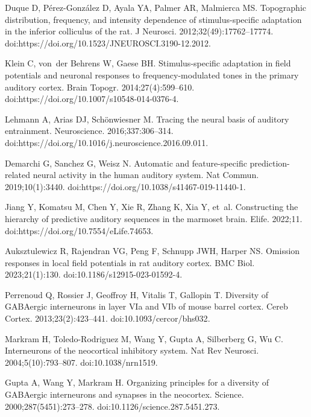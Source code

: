 \documentclass[10pt,letterpaper]{article}
\begin{document}
\begin{thebibliography}{100}
  Duque D, P{\'e}rez-Gonz{\'a}lez D, Ayala YA, Palmer AR, Malmierca MS.
  \newblock Topographic distribution, frequency, and intensity dependence of
    stimulus-specific adaptation in the inferior colliculus of the rat.
  \newblock J Neurosci. 2012;32(49):17762--17774.
  \newblock doi:{https://doi.org/10.1523/JNEUROSCI.3190-12.2012}.
  
  Klein C, von~der Behrens W, Gaese BH.
  \newblock Stimulus-specific adaptation in field potentials and neuronal
    responses to frequency-modulated tones in the primary auditory cortex.
  \newblock Brain Topogr. 2014;27(4):599--610.
  \newblock doi:{https://doi.org/10.1007/s10548-014-0376-4}.
  
  Lehmann A, Arias DJ, Sch{\"o}nwiesner M.
  \newblock Tracing the neural basis of auditory entrainment.
  \newblock Neuroscience. 2016;337:306--314.
  \newblock doi:{https://doi.org/10.1016/j.neuroscience.2016.09.011}.
  
  Demarchi G, Sanchez G, Weisz N.
  \newblock Automatic and feature-specific prediction-related neural activity in
    the human auditory system.
  \newblock Nat Commun. 2019;10(1):3440.
  \newblock doi:{https://doi.org/10.1038/s41467-019-11440-1}.
  
  Jiang Y, Komatsu M, Chen Y, Xie R, Zhang K, Xia Y, et~al.
  \newblock Constructing the hierarchy of predictive auditory sequences in the
    marmoset brain.
  \newblock Elife. 2022;11.
  \newblock doi:{https://doi.org/10.7554/eLife.74653}.
  
  Auksztulewicz R, Rajendran VG, Peng F, Schnupp JWH, Harper NS.
  \newblock Omission responses in local field potentials in rat auditory cortex.
  \newblock BMC Biol. 2023;21(1):130.
  \newblock doi:{10.1186/s12915-023-01592-4}.
  
  Perrenoud Q, Rossier J, Geoffroy H, Vitalis T, Gallopin T.
  \newblock Diversity of {GABAergic} interneurons in layer {VIa} and {VIb} of
    mouse barrel cortex.
  \newblock Cereb Cortex. 2013;23(2):423--441.
  \newblock doi:{10.1093/cercor/bhs032}.
  
  Markram H, Toledo-Rodriguez M, Wang Y, Gupta A, Silberberg G, Wu C.
  \newblock Interneurons of the neocortical inhibitory system.
  \newblock Nat Rev Neurosci. 2004;5(10):793--807.
  \newblock doi:{10.1038/nrn1519}.
  
  Gupta A, Wang Y, Markram H.
  \newblock Organizing principles for a diversity of {GABAergic} interneurons and
    synapses in the neocortex.
  \newblock Science. 2000;287(5451):273--278.
  \newblock doi:{10.1126/science.287.5451.273}.
  
  \end{thebibliography}
\end{document}
